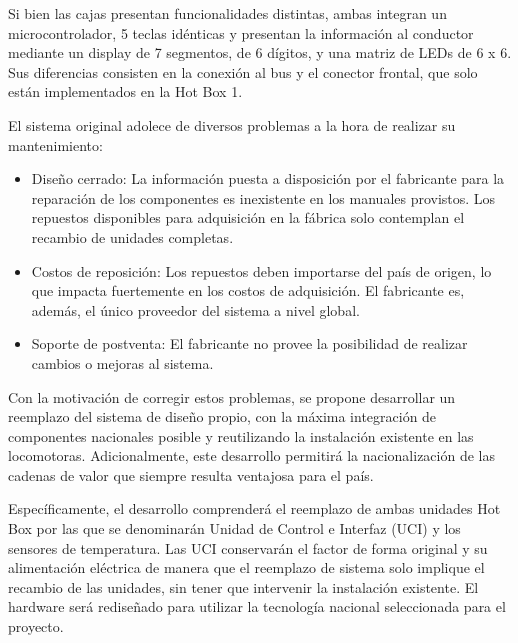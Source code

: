 \documentclass[
11pt, %
codirector, %
]{charter}
\begin{document}
Si bien las cajas presentan funcionalidades distintas, ambas integran un microcontrolador, 5 teclas idénticas y presentan la información al conductor mediante un display de 7 segmentos, de 6 dígitos, y una matriz de LEDs de 6 x 6.
Sus diferencias consisten en la conexión al bus y el conector frontal, que solo están implementados en la Hot Box 1.

El sistema original adolece de diversos problemas a la hora de realizar su mantenimiento:
\begin{itemize}
\item Diseño cerrado: La información puesta a disposición por el fabricante para la reparación de los componentes es inexistente en los manuales provistos. Los repuestos disponibles para adquisición en la fábrica solo contemplan el recambio de unidades completas.
\item Costos de reposición: Los repuestos deben importarse del país de origen, lo que impacta fuertemente en los costos de adquisición. El fabricante es, además, el único proveedor del sistema a nivel global.
\item Soporte de postventa: El fabricante no provee la posibilidad de realizar cambios o mejoras al sistema. 
\end{itemize}

Con la motivación de corregir estos problemas, se propone desarrollar un reemplazo del sistema de diseño propio, con la máxima integración de componentes nacionales posible y reutilizando la instalación existente en las locomotoras. Adicionalmente, este desarrollo permitirá la nacionalización de las cadenas de valor que siempre resulta ventajosa para el país. 

Específicamente, el desarrollo comprenderá el reemplazo de ambas unidades Hot Box por las que se denominarán Unidad de Control e Interfaz (UCI) y los sensores de temperatura.
Las UCI conservarán el factor de forma original y su alimentación eléctrica de manera que el reemplazo de sistema solo implique el recambio de las unidades, sin tener que intervenir la instalación existente. El hardware será rediseñado para utilizar la tecnología nacional seleccionada para el proyecto.
\end{document}
